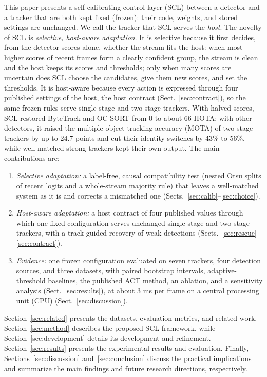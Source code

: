 \documentclass[pdflatex,sn-mathphys-num,iicol]{sn-jnl}
\newcommand{\scl}{SCL}
\begin{document}
This paper presents a self-calibrating control layer (\scl{}) between a detector and a tracker that
are both kept fixed (frozen): their code, weights, and stored settings are unchanged. We call the
tracker that \scl{} serves the \emph{host}. The novelty of \scl{} is \emph{selective, host-aware
adaptation}. It is selective because it first decides, from the detector scores alone, whether the
stream fits the host: when most higher scores of recent frames form a clearly confident group, the
stream is clean and the host keeps its scores and thresholds; only when many scores are uncertain
does \scl{} choose the candidates, give them new scores, and set the thresholds. It is host-aware
because every action is expressed through four published settings of the host, the host contract
(Sect.~\ref{sec:contract}), so the same frozen rules serve single-stage and two-stage trackers.
With halved scores, \scl{} restored ByteTrack and OC-SORT from 0 to about 66 HOTA; with other
detectors, it raised the multiple object tracking accuracy (MOTA) of two-stage trackers by up to
24.7 points and cut their identity switches by 43\% to 56\%, while well-matched strong trackers
kept their own output. The main contributions are:
\begin{enumerate}
\item \emph{Selective adaptation:} a label-free, causal compatibility test (nested Otsu splits of
      recent logits and a whole-stream majority rule) that leaves a well-matched system as it is
      and corrects a mismatched one (Sects.~\ref{sec:calib}--\ref{sec:choice}).
\item \emph{Host-aware adaptation:} a host contract of four published values through which one
      fixed configuration serves unchanged single-stage and two-stage trackers, with a track-guided
      recovery of weak detections (Sects.~\ref{sec:rescue}--\ref{sec:contract}).
\item \emph{Evidence:} one frozen configuration evaluated on seven trackers, four detection sources,
      and three datasets, with paired bootstrap intervals, adaptive-threshold baselines, the
      published ACT method, an ablation, and a sensitivity analysis (Sect.~\ref{sec:results}), at
      about 3 ms per frame on a central processing unit (CPU) (Sect.~\ref{sec:discussion}).
\end{enumerate}

Section~\ref{sec:related} presents the datasets, evaluation metrics, and related work.
Section~\ref{sec:method} describes the proposed \scl{} framework, while
Section~\ref{sec:development} details its development and refinement. Section~\ref{sec:results}
presents the experimental results and evaluation. Finally, Sections~\ref{sec:discussion}
and~\ref{sec:conclusion} discuss the practical implications and summarize the main findings and
future research directions, respectively.
\end{document}
